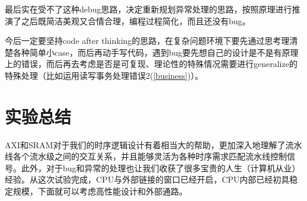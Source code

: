 \documentclass[UTF-8,twoside,c5size]{ctexart}
\begin{document}
	最后实在受不了这种debug思路，决定重新规划异常处理的思路，按照原理进行推演了之后既简洁美观又合情合理，编程过程简化，而且还没有bug。
	
	今后一定要坚持code after thinking的思路，在复杂问题环境下要先通过思考理清楚各种简单小case，而后再动手写代码，遇到bug要先想自己的设计是不是有原理上的错误，而后再去考虑是否是可复现、理论性的特殊情况需要进行generalize的特殊处理（比如运用读写事务处理错误2(\ref{business})）。
	
	\section{实验总结}
	
	AXI和SRAM对于我们的时序逻辑设计有着相当大的帮助，更加深入地理解了流水线各个流水级之间的交互关系，并且能够灵活为各种时序需求匹配流水线控制信号。此外，对于bug和异常的处理也让我们收获了很多宝贵的人生（计算机从业）经验。从这次试验完成，CPU与外部链接的窗口已经开启，CPU内部已经初具稳定规模，下面就可以考虑高性能设计和外部通路。
	
\end{document}
